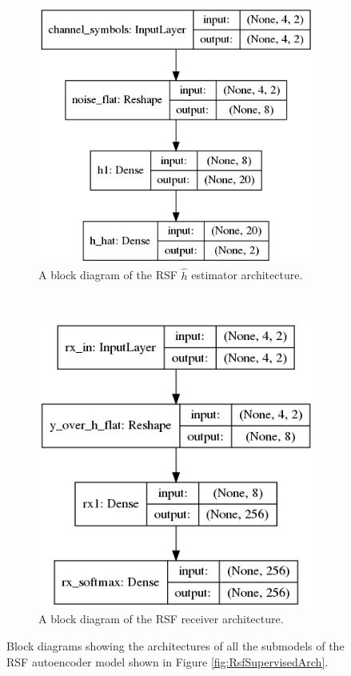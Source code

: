 \documentclass[12pt,onecolumn,letterpaper]{article}
\begin{document}
\begin{figure}[t!]
\begin{subfigure}[t]{0.3\textwidth}
       \centering
       \includegraphics[width=\linewidth]{figures/aoudia_paper/h_estimator_rsf_arch.png}
       \caption{A block diagram of the RSF $\hat{h}$ estimator architecture.}
       \label{fig:RsfHestArch}
   \end{subfigure}
   ~
   \begin{subfigure}[t]{0.3\textwidth}
       \centering
       \includegraphics[width=\linewidth]{figures/aoudia_paper/receiver_rsf_arch.png}
       \caption{A block diagram of the RSF receiver architecture.}
       \label{fig:RsfRxArch}
   \end{subfigure}
   \caption{Block diagrams showing the architectures of all the submodels of the RSF autoencoder model shown in Figure \ref{fig:RsfSupervisedArch}.}
   \label{fig:RsfArchitectures}
\end{figure}
\end{document}
